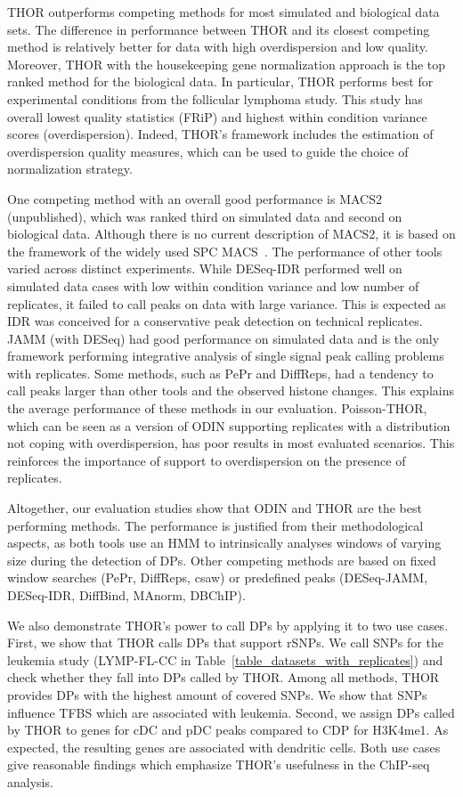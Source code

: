 THOR outperforms competing methods for most simulated and biological data sets.  
The difference in performance between THOR and its closest competing method is relatively better for data with high overdispersion and low quality. 
Moreover, THOR with the housekeeping gene normalization approach is the top ranked method for the biological data. 
In particular, THOR performs best for experimental conditions from the follicular lymphoma study. 
This study has overall lowest quality statistics (FRiP) and highest within condition variance scores (overdispersion). 
Indeed, THOR's framework includes the estimation of overdispersion quality measures, which can be used to guide the choice of normalization strategy. 

One competing method with an overall good performance is MACS2 (unpublished), which was ranked third on simulated data and second on biological data. 
Although there is no current description of MACS2, it is based on  the framework of the widely used SPC MACS~\cite{zhang2008}.
The performance of other tools varied across distinct experiments. 
While DESeq-IDR performed well on simulated data cases with low within condition variance and low number of replicates, it failed to call peaks on data with large variance. 
This is expected as IDR was conceived for a conservative peak detection on technical replicates. 
JAMM (with DESeq) had good performance on simulated data and is the only framework performing integrative analysis of single signal peak calling problems with replicates. 
Some methods, such as PePr and DiffReps, had a tendency to call peaks larger than other tools and the observed histone changes. 
This explains the average performance of these methods in our evaluation. 
Poisson-THOR, which can be seen as a version of ODIN supporting replicates with a distribution not coping with overdispersion, has poor results in most evaluated scenarios. 
This reinforces the importance of support to overdispersion on the presence of replicates.

Altogether, our evaluation studies show that ODIN and THOR are the best performing methods.
The performance is justified from their methodological aspects, as both tools use an HMM to intrinsically analyses windows of varying size during the detection of DPs. 
Other competing methods are based on fixed window searches (PePr, DiffReps, csaw) or predefined peaks (DESeq-JAMM, DESeq-IDR, DiffBind, MAnorm, DBChIP).

We also demonstrate THOR's power to call DPs by applying it to two use cases.
First, we show that THOR calls DPs that support rSNPs.
We call SNPs for the leukemia study (LYMP-FL-CC in Table~\ref{table_datasets_with_replicates}) and check whether they fall into DPs called by THOR.
Among all methods, THOR provides DPs with the highest amount of covered SNPs.
We show that SNPs influence TFBS which are associated with leukemia.
Second, we assign DPs called by THOR to genes for cDC and pDC peaks compared to CDP for H3K4me1.
As expected, the resulting genes are associated with dendritic cells.
Both use cases give reasonable findings which emphasize THOR's usefulness in the ChIP-seq analysis.

